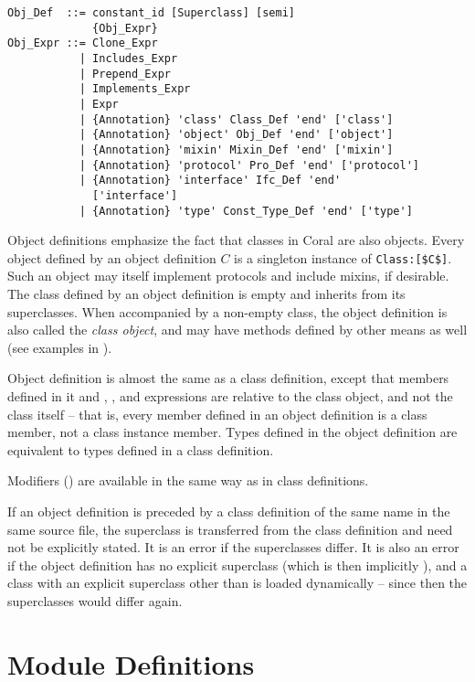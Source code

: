 \syntax\begin{lstlisting}
Obj_Def  ::= constant_id [Superclass] [semi]
             {Obj_Expr}
Obj_Expr ::= Clone_Expr
           | Includes_Expr
           | Prepend_Expr
           | Implements_Expr
           | Expr
           | {Annotation} 'class' Class_Def 'end' ['class']
           | {Annotation} 'object' Obj_Def 'end' ['object']
           | {Annotation} 'mixin' Mixin_Def 'end' ['mixin']
           | {Annotation} 'protocol' Pro_Def 'end' ['protocol']
           | {Annotation} 'interface' Ifc_Def 'end' 
             ['interface']
           | {Annotation} 'type' Const_Type_Def 'end' ['type']
\end{lstlisting}

Object definitions emphasize the fact that classes in Coral are also objects. Every object defined by an object definition $C$ is a singleton instance of \lstinline!Class:[$C$]!. Such an object may itself implement protocols and include mixins, if desirable. The class defined by an object definition is empty and inherits from its superclasses. When accompanied by a non-empty class, the object definition is also called the {\em class object}, and may have methods defined by other means as well (see examples in ).

Object definition is almost the same as a class definition, except that members defined in it and , ,  and  expressions are relative to the class object, and not the class itself -- that is, every member defined in an object definition is a class member, not a class instance member. Types defined in the object definition are equivalent to types defined in a class definition. 

Modifiers () are available in the same way as in class definitions. 

If an object definition is preceded by a class definition of the same name in the same source file, the superclass is transferred from the class definition and need not be explicitly stated. It is an error if the superclasses differ. It is also an error if the object definition has no explicit superclass (which is then implicitly ), and a class with an explicit superclass other than  is loaded dynamically -- since then the superclasses would differ again. 

\section{Module Definitions}
\label{sec:module-definitions}

